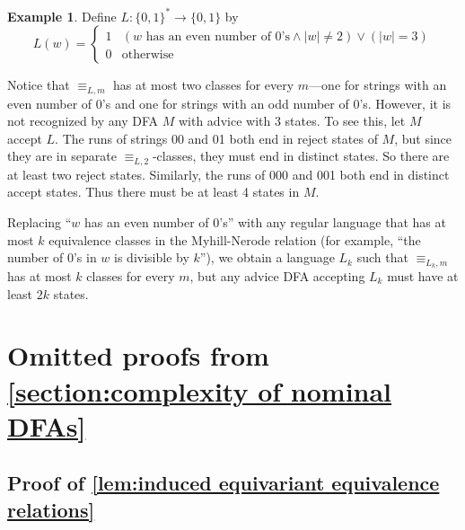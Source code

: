 \documentclass[11pt,a4paper]{amsart}
\theoremstyle{definition}
\newtheorem{example}{Example}
\begin{document}
\begin{example}
    Define $L : \{0,1\}^* \to \{0,1\}$ by 
    \[
      L(w) = \begin{cases} 1 & (w \text{ has an even number of 0's} \land |w| \neq 2) \lor (|w| = 3) \\
                           0 & \text{otherwise} \end{cases}
    \]
  \end{example}
  
  
  Notice that $\equiv_{L,m}$ has at most two classes for every $m$---one for strings with an even number of 0's and one for strings with an odd number of 0's.
  However, it is not recognized by any DFA $M$ with advice with 3 states. 
  To see this, let $M$ accept $L$.
  The runs of strings 00 and 01 both end in reject states of $M$, but since they are in separate $\equiv_{L,2}$-classes, they must end in distinct states. 
  So there are at least two reject states.
  Similarly, the runs of 000 and 001 both end in distinct accept states. 
  Thus there must be at least 4 states in $M$.
  
  Replacing ``$w$ has an even number of 0's'' with any regular language that has at most $k$ equivalence classes in the Myhill-Nerode relation (for example, ``the number of 0's in $w$ is divisible by $k$''), we obtain a language $L_k$ such that $\equiv_{L_k,m}$ has at most $k$ classes for every $m$, but any advice DFA accepting $L_k$ must have at least $2k$ states.

  \section{Omitted proofs from \autoref{section:complexity of nominal DFAs}} \label{appendix:nominal DFAs omitted proofs}


  \subsection{Proof of \autoref{lem:induced equivariant equivalence relations}} \label{appendix:proof of induced equivariant equivalence relations}
\end{document}
